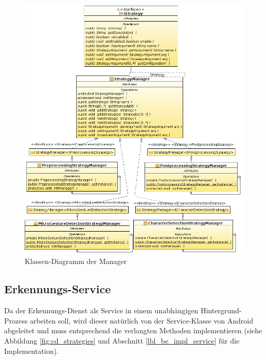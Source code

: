\begin{figure}[bh!]
   \centering
   \includegraphics[width=\textwidth]{img/uml_cd_manager} 
   \caption{Klassen-Diagramm der Manager}
   \label{fig:cd_manager}
\end{figure}

\subsection{Erkennungs-Service}

Da der Erkennungs-Dienst als Service in einem unabhängigen Hintergrund-Prozess arbeiten soll, wird dieser natürlich von der Service-Klasse von Android abgeleitet und muss entsprechend die verlangten Methoden implementieren  (siehe Abbildung \ref{fig:cd_strategies} und Abschnitt \ref{lbl_be_impl_service} für die Implementation).

